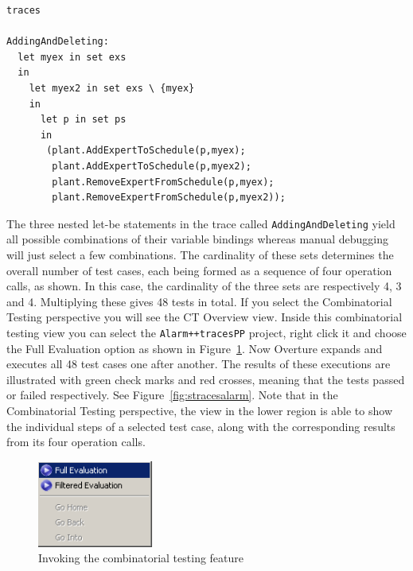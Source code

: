 \begin{lstlisting}
traces

AddingAndDeleting: 
  let myex in set exs
  in
    let myex2 in set exs \ {myex}
    in
      let p in set ps 
      in
       (plant.AddExpertToSchedule(p,myex);
        plant.AddExpertToSchedule(p,myex2);
        plant.RemoveExpertFromSchedule(p,myex);
        plant.RemoveExpertFromSchedule(p,myex2));
\end{lstlisting}

\noindent The three nested let-be statements in the trace
called \texttt{AddingAndDeleting} yield all possible combinations of
their variable bindings whereas manual debugging will just select a
few combinations.  The cardinality of these sets determines the
overall number of test cases, each being formed as a sequence of four
operation calls, as shown. In this case, the cardinality of the three
sets are respectively 4, 3 and 4. Multiplying these gives 48 tests in total. If you
select the Combinatorial Testing perspective you will see the
\textsf{CT Overview} view. 
Inside this combinatorial testing view you can
select the \texttt{Alarm++tracesPP} project, right click it and 
choose the \textsf{Full
  Evaluation} option as shown in Figure~\ref{fig:CToptions}. 
Now Overture expands and executes all 48 test cases one after
another. The results of these executions are illustrated with green
check marks and red crosses, meaning that the tests passed or failed
respectively. See Figure~\ref{fig:stracesalarm}. Note that in the
Combinatorial Testing perspective, the view in the lower region is
able to show the individual steps of a selected test case, along with
the corresponding results from its four operation calls.

\begin{figure}[htbp]
\begin{center}
\includegraphics[width=1.5in]{figures/CToptions}
\caption{Invoking the combinatorial testing feature\label{fig:CToptions}}
\end{center}
\end{figure}

